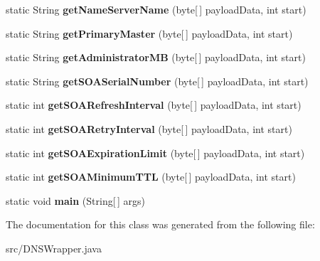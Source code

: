 \begin{DoxyCompactItemize}
\item 
\hypertarget{class_d_n_s_wrapper_a329fbd5ce95d48c897c09f1ae3150226}{static String {\bfseries get\-Name\-Server\-Name} (byte\mbox{[}$\,$\mbox{]} payload\-Data, int start)}\label{class_d_n_s_wrapper_a329fbd5ce95d48c897c09f1ae3150226}

\item 
\hypertarget{class_d_n_s_wrapper_aee33f3933159ef9bf71b4c091405ad5a}{static String {\bfseries get\-Primary\-Master} (byte\mbox{[}$\,$\mbox{]} payload\-Data, int start)}\label{class_d_n_s_wrapper_aee33f3933159ef9bf71b4c091405ad5a}

\item 
\hypertarget{class_d_n_s_wrapper_a9f3a23b87a11a63d93ab65695876f75c}{static String {\bfseries get\-Administrator\-M\-B} (byte\mbox{[}$\,$\mbox{]} payload\-Data, int start)}\label{class_d_n_s_wrapper_a9f3a23b87a11a63d93ab65695876f75c}

\item 
\hypertarget{class_d_n_s_wrapper_a850abc8f62b86d620357bf3d0dc50714}{static String {\bfseries get\-S\-O\-A\-Serial\-Number} (byte\mbox{[}$\,$\mbox{]} payload\-Data, int start)}\label{class_d_n_s_wrapper_a850abc8f62b86d620357bf3d0dc50714}

\item 
\hypertarget{class_d_n_s_wrapper_aabd3ff59b9a6fd72c27b21a1e3405187}{static int {\bfseries get\-S\-O\-A\-Refresh\-Interval} (byte\mbox{[}$\,$\mbox{]} payload\-Data, int start)}\label{class_d_n_s_wrapper_aabd3ff59b9a6fd72c27b21a1e3405187}

\item 
\hypertarget{class_d_n_s_wrapper_a4e77471b30c0d2c6c757f68626103150}{static int {\bfseries get\-S\-O\-A\-Retry\-Interval} (byte\mbox{[}$\,$\mbox{]} payload\-Data, int start)}\label{class_d_n_s_wrapper_a4e77471b30c0d2c6c757f68626103150}

\item 
\hypertarget{class_d_n_s_wrapper_a31004373ed487a3a19f9d4ead5d88524}{static int {\bfseries get\-S\-O\-A\-Expiration\-Limit} (byte\mbox{[}$\,$\mbox{]} payload\-Data, int start)}\label{class_d_n_s_wrapper_a31004373ed487a3a19f9d4ead5d88524}

\item 
\hypertarget{class_d_n_s_wrapper_abd2d2a668fa4834432536a22dede0116}{static int {\bfseries get\-S\-O\-A\-Minimum\-T\-T\-L} (byte\mbox{[}$\,$\mbox{]} payload\-Data, int start)}\label{class_d_n_s_wrapper_abd2d2a668fa4834432536a22dede0116}

\item 
\hypertarget{class_d_n_s_wrapper_a74e0ad92079a2aab6e5cd0bd3c8765f3}{static void {\bfseries main} (String\mbox{[}$\,$\mbox{]} args)}\label{class_d_n_s_wrapper_a74e0ad92079a2aab6e5cd0bd3c8765f3}

\end{DoxyCompactItemize}


The documentation for this class was generated from the following file\-:\begin{DoxyCompactItemize}
\item 
src/D\-N\-S\-Wrapper.\-java\end{DoxyCompactItemize}
